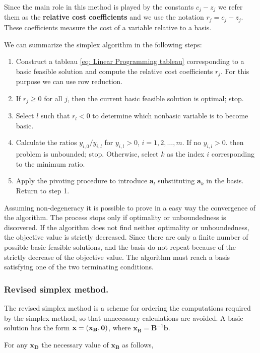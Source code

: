 Since the main role in this method is played by the constants $c_j-z_j$ we refer them as the \textbf{relative cost coefficients} and we use the notation $r_j=c_j-z_j$. These coefficients measure the cost of a variable relative to a basis.


We can summarize the simplex algorithm in the following steps:
\begin{enumerate}
	\item Construct a tableau \eqref{eq: Linear Programming tableau} corresponding to a basic feasible solution and compute the relative cost coefficients $r_j$. For this purpose we can use row reduction.
	\item If $r_j\geq 0$ for all $j$, then the current basic feasible solution is optimal; stop.
	\item Select $l$ such that $r_l<0$ to determine which nonbasic variable is to become basic.
	\item Calculate the ratios $y_{i,0}/y_{i,l}$ for $y_{i,l}>0$, $i=1,2,\dots, m$. If no $y_{i,l}>0$. then problem is unbounded; stop. Otherwise, select $k$ as the index $i$ corresponding to the minimum ratio. 
	\item Apply the pivoting procedure to introduce $\mathbf{a}_l$ substituting $\mathbf{a}_k$ in the basis. Return to step 1.
\end{enumerate} 
Assuming non-degeneracy it is possible to prove in a easy way the convergence of the algorithm. The process stops only if optimality or unboundedness is discovered.
If the algorithm does not find neither optimality or unboundedness, the objective value is strictly decreased. Since there are only a finite number of possible basic feasible solutions, and the basis do not repeat because of the strictly decrease of the objective value. The algorithm must reach a basis satisfying one of the two terminating conditions.
\\
\subsubsection{Revised simplex method.}
The revised simplex method is a scheme for ordering the computations required by the simplex method, so that unnecessary calculations are avoided. A basic solution has the form $\mathbf{x}=\left( \mathbf{x}_{\mathbf{B}}, \mathbf{0} \right)$, where $\mathbf{x}_\mathbf{B}=\mathbf{B}^{-1}\mathbf{b}$. 

For any $\mathbf{x}_{\mathbf{D}}$ the necessary value of $\mathbf{x}_{\mathbf{B}}$ as follows,

